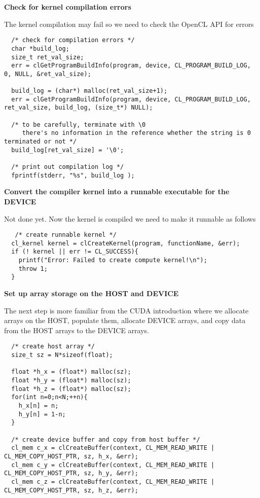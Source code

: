 {\bf Check for kernel compilation errors}

The kernel compilation may fail so we need to check the OpenCL API for errors

\begin{verbatim}
  /* check for compilation errors */
  char *build_log;
  size_t ret_val_size;
  err = clGetProgramBuildInfo(program, device, CL_PROGRAM_BUILD_LOG, 0, NULL, &ret_val_size);

  build_log = (char*) malloc(ret_val_size+1);
  err = clGetProgramBuildInfo(program, device, CL_PROGRAM_BUILD_LOG, ret_val_size, build_log, (size_t*) NULL);

  /* to be carefully, terminate with \0                           
     there's no information in the reference whether the string is 0 terminated or not */
  build_log[ret_val_size] = '\0';

  /* print out compilation log */
  fprintf(stderr, "%s", build_log );
\end{verbatim}

{\bf Convert the compiler kernel into a runnable executable for the DEVICE}

Not done yet. Now the kernel is compiled we need to make it runnable as follows

\begin{verbatim}
   /* create runnable kernel */
  cl_kernel kernel = clCreateKernel(program, functionName, &err);
  if (! kernel || err != CL_SUCCESS){
    printf("Error: Failed to create compute kernel!\n");
    throw 1;
  }
\end{verbatim}

{\bf Set up array storage on the HOST and DEVICE}

The next step is more familiar from the CUDA introduction where we allocate arrays on the HOST, populate them, allocate DEVICE arrays, and copy data from the HOST arrays to the DEVICE arrays.

\begin{verbatim}
  /* create host array */
  size_t sz = N*sizeof(float);

  float *h_x = (float*) malloc(sz);
  float *h_y = (float*) malloc(sz);
  float *h_z = (float*) malloc(sz);
  for(int n=0;n<N;++n){
    h_x[n] = n;
    h_y[n] = 1-n;
  }

  /* create device buffer and copy from host buffer */
  cl_mem c_x = clCreateBuffer(context, CL_MEM_READ_WRITE | CL_MEM_COPY_HOST_PTR, sz, h_x, &err);
  cl_mem c_y = clCreateBuffer(context, CL_MEM_READ_WRITE | CL_MEM_COPY_HOST_PTR, sz, h_y, &err);
  cl_mem c_z = clCreateBuffer(context, CL_MEM_READ_WRITE | CL_MEM_COPY_HOST_PTR, sz, h_z, &err);
\end{verbatim}

